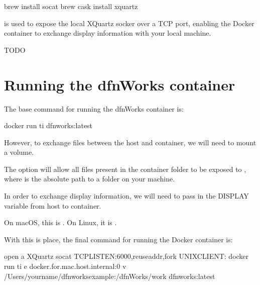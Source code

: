 \documentclass[letterpaper,10pt,english]{sphinxmanual}
\begin{document}
%
\begin{sphinxVerbatim}[commandchars=\\\{\}]
brew install socat
brew cask install xquartz
\end{sphinxVerbatim}

 is used to expose the local XQuartz socker over a TCP port, enabling the
Docker container to exchange display information with your local machine.


%
\begin{sphinxVerbatim}[commandchars=\\\{\}]
TODO
\end{sphinxVerbatim}


\section{Running the dfnWorks container}
\label{\detokenize{setup:running-the-dfnworks-container}}
The base command for running the dfnWorks container is:

%
\begin{sphinxVerbatim}[commandchars=\\\{\}]
docker run \PYGZhy{}ti dfnworks:latest
\end{sphinxVerbatim}

However, to exchange files between the host and container, we will need to mount
a volume.

The option  will allow all files present in the
container folder  to be exposed to , where
 is the absolute path to a folder on your machine.

In order to exchange display information, we will need to pass in the DISPLAY
variable from host to container.

On macOS, this is . On Linux, it is
.

With this is place, the final command for running the Docker container is:


%
\begin{sphinxVerbatim}[commandchars=\\\{\}]
open \PYGZhy{}a XQuartz
socat TCP\PYGZhy{}LISTEN:6000,reuseaddr,fork UNIX\PYGZhy{}CLIENT:
docker run \PYGZhy{}ti 
       \PYGZhy{}e docker.for.mac.host.internal:0 
       \PYGZhy{}v /Users/yourname/dfnworks\PYGZhy{}example:/dfnWorks/work 
       dfnworks:latest
\end{sphinxVerbatim}
\end{document}
